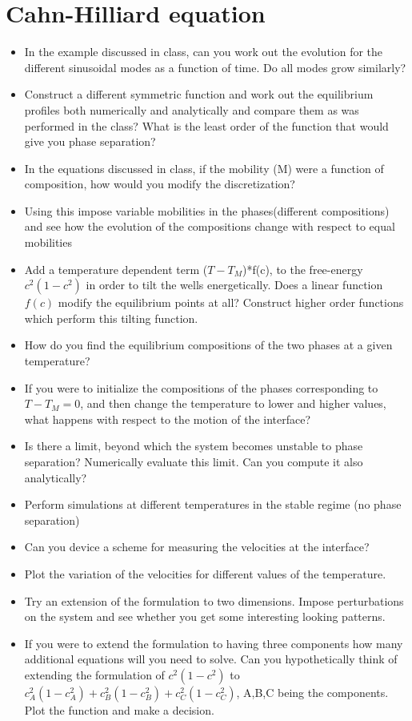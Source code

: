 \documentclass[a4paper,10pt]{article}
\begin{document}
\section{Cahn-Hilliard equation}
\begin{itemize}
 \item In the example discussed in class, can you work out the evolution for
 the different sinusoidal modes as a function of time. Do all modes grow similarly?
 \item Construct a different symmetric function and work out the equilibrium 
 profiles both numerically and analytically and compare them as was performed in the 
 class? What is the least order of the function that would give you phase separation?
 \item In the equations discussed in class, if the mobility (M) were a function of
 composition, how would you modify the discretization?
 \item Using this impose variable mobilities in the phases(different compositions)
 and see how the evolution of the compositions change with respect to equal 
 mobilities
 \item Add a temperature dependent term ($T-T_M$)*f(c), to the free-energy $c^{2}\left(1-c^{2}\right)$ 
 in order to tilt the wells energetically. Does a linear function $f(c)$ modify the equilibrium points 
 at all? Construct higher order functions which perform this tilting function.
 \item How do you find the equilibrium compositions of the two phases at
 a given temperature?
 \item If you were to initialize the compositions of the phases corresponding to 
 $T-T_M =0$, and then change the temperature to lower and higher values, what 
 happens with respect to the motion of the interface?
 \item Is there a limit, beyond which the system becomes unstable to phase 
 separation? Numerically evaluate this limit. Can you compute it also 
 analytically?
 \item Perform simulations at different temperatures in the stable regime (no phase separation)
 \item Can you device a scheme for measuring the velocities at the interface?
 \item Plot the variation of the velocities for different values of the temperature.
 \item Try an extension of the formulation to two dimensions. Impose perturbations 
 on the system and see whether you get some interesting looking patterns.
 \item If you were to extend the formulation to having three components how many additional 
 equations will you need to solve. Can you hypothetically think of extending the formulation of 
 $c^{2}\left(1-c^{2}\right)$ to $c_A^{2}\left(1-c_A^{2}\right) + c_B^{2}\left(1-c_B^{2}\right) + 
 c_C^{2}\left(1-c_C^{2}\right)$,
 A,B,C being the components. Plot the function and make a decision. 
\end{itemize}
\end{document}
